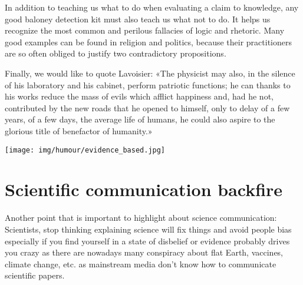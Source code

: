 	In addition to teaching us what to do when evaluating a claim to knowledge, any good baloney detection kit must also teach us what not to do. It helps us recognize the most common and perilous fallacies of logic and rhetoric. Many good examples can be found in religion and politics, because their practitioners are so often obliged to justify two contradictory propositions.


	Finally, we would like to quote Lavoisier: «The physicist may also, in the silence of his laboratory and his cabinet, perform patriotic functions; he can thanks to his works reduce the mass of evils which afflict happiness and, had he not, contributed by the new roads that he opened to himself, only to delay of a few years, of a few days, the average life of humans, he could also aspire to the glorious title of benefactor of humanity.»
	\begin{center}
		\texttt{[image: img/humour/evidence\_based.jpg]}	
	\end{center}
	
	\pagebreak
	\section{Scientific communication backfire}
	Another point that is important to highlight about science communication: Scientists, stop thinking explaining science will fix things and avoid people bias especially if you find yourself in a state of disbelief or evidence probably drives you crazy as there are nowadays many conspiracy about flat Earth, vaccines, climate change, etc. as mainstream media don't know how to communicate scientific papers.

